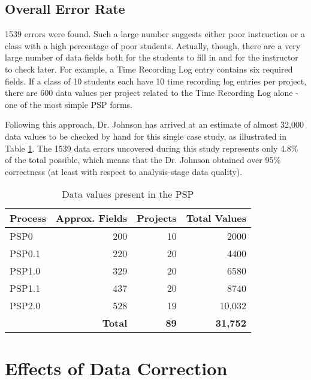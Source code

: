 \subsection{Overall Error Rate}

1539 errors were found.  Such a large number suggests either poor
instruction or a class with a high percentage of poor students. Actually,
though, there are a very large number of data fields both for the students
to fill in and for the instructor to check later.  For example, a Time
Recording Log entry contains six required fields.  If a class of 10
students each have 10 time recording log entries per project, there are 600
data values per project related to the Time Recording Log alone - one of
the most simple PSP forms.

Following this approach, Dr. Johnson has arrived at an estimate of almost
32,000 data values to be checked by hand for this single case study, as
illustrated in Table \ref{table:overallErrors}.  The 1539 data errors uncovered
during this study represents only 4.8\% of the total possible, which means
that the Dr. Johnson obtained over 95\% correctness (at least with respect
to analysis-stage data quality).

\begin{table}
   \begin{center} 
   \caption{\label{table:overallErrors}Data values present in the PSP}
   \begin{tabular}{|l|r|r|r|}\hline 
   Process & Approx. Fields & Projects & Total Values \\ \hline\hline 
   PSP0    & 200 &  10 &  2000 \\ \hline 
   PSP0.1  & 220 &  20 &  4400 \\ \hline 
   PSP1.0  & 329 &  20 &  6580 \\ \hline 
   PSP1.1  & 437 &  20 &  8740 \\ \hline  
   PSP2.0  & 528 &  19 &  10,032 \\ \hline 
   \multicolumn{2}{|r|}{\bf Total} &  {\bf 89} &  {\bf 31,752} \\ \hline 
   \end{tabular}
   \end{center} 
\end{table}


\section{\label{section:Correction}Effects of Data Correction}  

